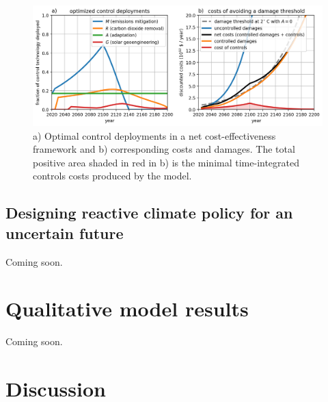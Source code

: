 \documentclass{article}
\begin{document}
\begin{figure}[htb!]
\noindent\includegraphics[width=1.0\textwidth]{figures/default-temp_controls_and_damages.png}
\centering
\caption{a) Optimal control deployments in a net cost-effectiveness framework and b) corresponding costs and damages. The total positive area shaded in red in b) is the minimal time-integrated controls costs produced by the model.}
\label{fig.approach2}
\end{figure}

\subsection{Designing reactive climate policy for an uncertain future}\label{sec.reactive}

Coming soon.

\section{Qualitative model results}

Coming soon.



\section{Discussion}
\end{document}
